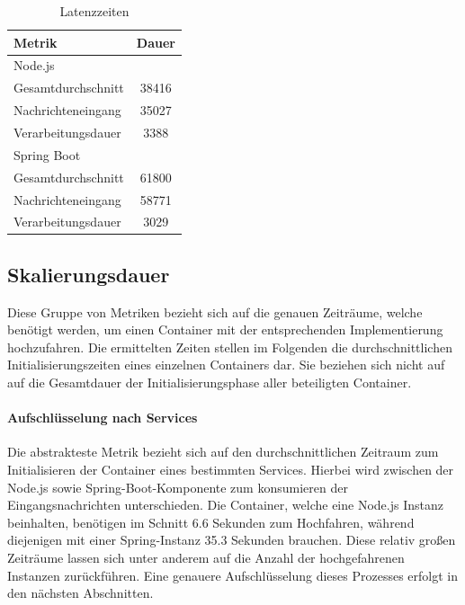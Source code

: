 \begin{table}
	\centering
	\caption[Latenzzeit - Vergleich]{Latenzzeiten}
  \label{tab:latency}
  \hspace{1cm}
  \begin{tabular}{@{}lc@{}}
    \toprule
    Metrik & Dauer \\
    \midrule
    Node.js \\
    \hspace{3mm}Gesamtdurchschnitt & 38416 \\
    \hspace{3mm}Nachrichteneingang & 35027 \\
    \hspace{3mm}Verarbeitungsdauer & 3388 \\
    \midrule
    Spring Boot \\
    \hspace{3mm}Gesamtdurchschnitt & 61800 \\
    \hspace{3mm}Nachrichteneingang & 58771 \\
    \hspace{3mm}Verarbeitungsdauer & 3029 \\
    \bottomrule
  \end{tabular}
\end{table} 


\subsection{Skalierungsdauer}
Diese Gruppe von Metriken bezieht sich auf die genauen Zeiträume, welche benötigt werden, um einen Container mit der entsprechenden Implementierung hochzufahren. Die ermittelten Zeiten stellen im Folgenden die durchschnittlichen Initialisierungszeiten eines einzelnen Containers dar. Sie beziehen sich nicht auf auf die Gesamtdauer der Initialisierungsphase aller beteiligten Container.

\paragraph{Aufschlüsselung nach Services}
Die abstrakteste Metrik bezieht sich auf den durchschnittlichen Zeitraum zum Initialisieren der Container eines bestimmten Services. Hierbei wird zwischen der Node.js sowie Spring-Boot-Komponente zum konsumieren der Eingangsnachrichten unterschieden. Die Container, welche eine Node.js Instanz beinhalten, benötigen im Schnitt 6.6 Sekunden zum Hochfahren, während diejenigen mit einer Spring-Instanz 35.3 Sekunden brauchen. Diese relativ großen Zeiträume lassen sich unter anderem auf die Anzahl der hochgefahrenen Instanzen zurückführen. Eine genauere Aufschlüsselung dieses Prozesses erfolgt in den nächsten Abschnitten. 



